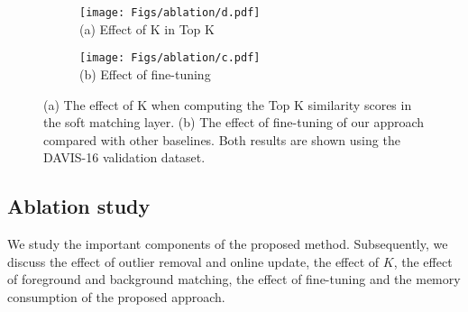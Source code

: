 \setlength{\figwidth}{0.35\textwidth}
\begin{figure*}[t]
\begin{center}
	\begin{subfigure}[b]{\figwidth}
		\texttt{[image: Figs/ablation/d.pdf]} \\ 
		\centering (a) Effect of K in Top K 
	\end{subfigure} \quad\quad
	\begin{subfigure}[b]{\figwidth}
		\texttt{[image: Figs/ablation/c.pdf]} \\
		\centering (b) Effect of fine-tuning
	\end{subfigure}\hfill
\end{center}
\caption{ (a) The effect of K when computing the Top K similarity scores  in the soft matching layer. (b) The effect of fine-tuning of our approach compared with other baselines. Both results are shown using the DAVIS-16 validation dataset.}
\label{fig:ablation}

\end{figure*}
 
\subsection{Ablation study}

We study the important components of the proposed method. Subsequently, we discuss the effect of outlier removal and online update, the effect of $K$, the effect of foreground and background matching, the effect of fine-tuning and the memory consumption of the proposed approach.


